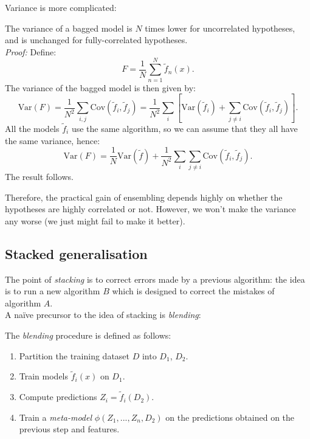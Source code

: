 \newpage
Variance is more complicated:

\begin{frameprop}
The variance of a bagged model is $N$ times lower for uncorrelated hypotheses, and is unchanged for fully-correlated hypotheses.\\

\textit{Proof:} Define:
\begin{equation*}
F = \frac{1}{N} \sum_{n=1}^{N} \tilde{f}_n(x).
\end{equation*}
The variance of the bagged model is then given by:
\begin{equation*}
\textrm{Var}(F) = \frac{1}{N^2} \sum_{i,j} \textrm{Cov}(\tilde{f}_i, \tilde{f}_j) = \frac{1}{N^2} \sum_{i} \left[ \textrm{Var}(\tilde{f}_i) + \sum_{j \neq i} \textrm{Cov}(\tilde{f}_i, \tilde{f}_j) \right].
\end{equation*}
All the models $\tilde{f}_i$ use the same algorithm, so we can assume that they all have the same variance, hence:
\begin{equation*}
\textrm{Var}(F) = \frac{1}{N} \textrm{Var}(\tilde{f}) + \frac{1}{N^2} \sum_{i} \sum_{j \neq i} \textrm{Cov}(\tilde{f}_i, \tilde{f}_j).
\end{equation*}
The result follows. \qedsymbol
\end{frameprop}

Therefore, the practical gain of ensembling depends highly on whether the hypotheses are highly correlated or not. However, we won't make the variance any worse (we just might fail to make it better).


\minirule

\subsection{Stacked generalisation}
The point of \textit{stacking} is to correct errors made by a previous algorithm: the idea is to run a new algorithm $B$ which is designed to correct the mistakes of algorithm $A$.\\

A na\"{i}ve precursor to the idea of stacking is  \textit{blending}:
\begin{framedef}
The \textit{blending} procedure is defined as follows:
\begin{enumerate}[label = (\arabic*)]
\item Partition the training dataset $D$ into $D_1$, $D_2$.
\item Train models $\tilde{f}_i(x)$ on $D_1$.
\item Compute predictions $Z_i = \tilde{f}_i(D_2)$.
\item Train a \textit{meta-model} $\phi(Z_1,...,Z_n,D_2)$ on the predictions obtained on the previous step and features.
\end{enumerate}
\end{framedef}

